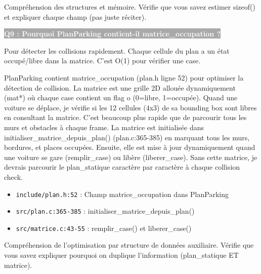 \documentclass[12pt,a4paper]{article}
\newcommand{\question}[1]{%
    \vspace{0.5cm}
    \noindent\colorbox{darkgray}{\textcolor{white}{\textbf{#1}}}
    \vspace{0.3cm}
}
\begin{document}
\begin{objectif_prof}
Compréhension des structures et mémoire. Vérifie que vous savez estimer sizeof() et expliquer chaque champ (pas juste réciter).
\end{objectif_prof}

\question{Q9 : Pourquoi PlanParking contient-il matrice\_occupation ?}

\begin{reponse_courte}
Pour détecter les collisions rapidement. Chaque cellule du plan a un état occupé/libre dans la matrice. C'est O(1) pour vérifier une case.
\end{reponse_courte}

\begin{reponse_longue}
PlanParking contient matrice\_occupation (plan.h ligne 52) pour optimiser la détection de collision. La matrice est une grille 2D allouée dynamiquement (mat*) où chaque case contient un flag o (0=libre, 1=occupée). Quand une voiture se déplace, je vérifie si les 12 cellules (4x3) de sa bounding box sont libres en consultant la matrice. C'est beaucoup plus rapide que de parcourir tous les murs et obstacles à chaque frame. La matrice est initialisée dans initialiser\_matrice\_depuis\_plan() (plan.c:365-385) en marquant tous les murs, bordures, et places occupées. Ensuite, elle est mise à jour dynamiquement quand une voiture se gare (remplir\_case) ou libère (liberer\_case). Sans cette matrice, je devrais parcourir le plan\_statique caractère par caractère à chaque collision check.
\end{reponse_longue}

\begin{reference_code}
\begin{itemize}
    \item \texttt{include/plan.h:52} : Champ matrice\_occupation dans PlanParking
    \item \texttt{src/plan.c:365-385} : initialiser\_matrice\_depuis\_plan()
    \item \texttt{src/matrice.c:43-55} : remplir\_case() et liberer\_case()
\end{itemize}
\end{reference_code}

\begin{objectif_prof}
Compréhension de l'optimisation par structure de données auxiliaire. Vérifie que vous savez expliquer pourquoi on duplique l'information (plan\_statique ET matrice).
\end{objectif_prof}
\end{document}
